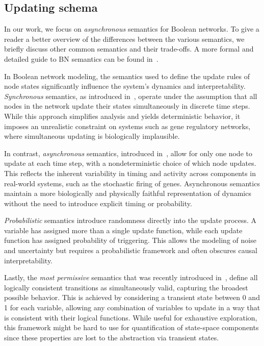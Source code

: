 \subsection{Updating schema}
\label{ss:updating_schemes}

In our work, we focus on \emph{asynchronous} semantics for Boolean networks. To give a reader a better overview of the differences between the various semantics, we briefly discuss other common semantics and their trade-offs. A more formal and detailed guide to BN semantics can be found in~\cite{Pauleve2023b}.

In Boolean network modeling, the semantics used to define the update rules of node states significantly influence the system's dynamics and interpretability. \emph{Synchronous} semantics, as introduced in~\cite{Kauffman1969}, operate under the assumption that all nodes in the network update their states simultaneously in discrete time steps. While this approach simplifies analysis and yields deterministic behavior, it imposes an unrealistic constraint on systems such as gene regulatory networks, where simultaneous updating is biologically implausible.

In contrast, \emph{asynchronous} semantics, introduced in~\cite{Thomas1973}, allow for only one node to update at each time step, with a nondeterministic choice of which node updates. This reflects the inherent variability in timing and activity across components in real-world systems, such as the stochastic firing of genes. Asynchronous semantics maintain a more biologically and physically faithful representation of dynamics without the need to introduce explicit timing or probability.

\emph{Probabilistic} semantics introduce randomness directly into the update process. A variable has assigned more than a single update function, while each update function has assigned probability of triggering. This allows the modeling of noise and uncertainty but requires a probabilistic framework and often obscures causal interpretability. 

Lastly, the \emph{most permissive} semantics that was recently introduced in~\cite{Pauleve2020}, define all logically consistent transitions as simultaneously valid, capturing the broadest possible behavior. This is achieved by considering a transient state between 0 and 1 for each variable, allowing any combination of variables to update in a way that is consistent with their logical functions. While useful for exhaustive exploration, this framework might be hard to use for quantification of state-space components since these properties are lost to the abstraction via transient states.

